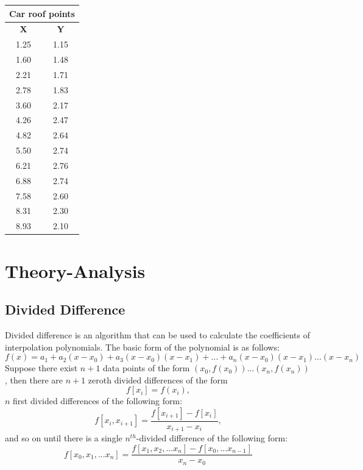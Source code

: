 \documentclass[12pt, letterpaper]{article} %
\begin{document}
\begin{center}
	\begin{tabular}{|c|c|}
	\hline
	\multicolumn{2}{|c|}{Car roof points}\\ \hline
	\textbf{X}&\textbf{Y}\\
		1.25&1.15\\
		1.60&1.48\\
		2.21&1.71\\
		2.78&1.83\\
		3.60&2.17\\
		4.26&2.47\\
		4.82&2.64\\
		5.50&2.74\\
		6.21&2.76\\
		6.88&2.74\\
		7.58&2.60\\
		8.31&2.30\\
		8.93&2.10\\
	\hline
	\end{tabular}
	
	\bigskip
\end{center}

\section{Theory-Analysis}

\subsection{Divided Difference}
Divided difference is an algorithm that can be used to calculate the coefficients of interpolation polynomials. The basic form of the polynomial is as follows:
\begin{equation}
f(x) = a_1 + a_2(x - x_0) + a_3(x - x_0)(x - x_1) + ... + a_n(x - x_0)(x - x_1)...(x - x_n)
\label{dd_basic_poly}
\end{equation}
Suppose there exist $n+1$ data points of the form $(x_0, f(x_0)) ... (x_n, f(x_n))$, then there are $n+1$ zeroth divided differences of the form 
\begin{equation}
f[x_i]=f(x_i),
\end{equation}
$n$ first divided differences of the following form:
\begin{equation}
f[x_i, x_{i+1}]=\dfrac{f[x_{i+1}] - f[x_i]}{x_{i+1} - x_i},
\label{dd_2nd}
\end{equation}
and so on until there is a single $n^{th}$-divided difference of the following form:
\begin{equation}
f[x_0, x_1, ...x _n]=\dfrac{f[x_1, x_2, ... x_n] - f[x_0, ... x_{n-1}]}{x_n - x_0}
\label{dd_3rd}
\end{equation}
\end{document}
